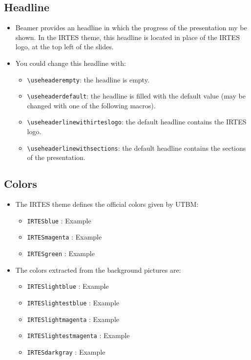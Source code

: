 \documentclass[english,circlenumberstyle]{irtesbeamer}
\begin{document}
\subsection{Headline}
\begin{frame}{\subsecname}
	\begin{footnotesize}
	\begin{itemize}
	\item Beamer provides an headline in which the progress of the presentation my be shown.
	In the IRTES theme, this headline is located in place of the IRTES logo, at the top left of the slides.
	\item You could change this headline with: \begin{itemize}\footnotesize
		\item \texttt{{\textbackslash}useheaderempty}: the headline is empty.
		\item \texttt{{\textbackslash}useheaderdefault}: the headline is filled with the default value (may be changed with one of the following macros).
		\item \texttt{{\textbackslash}useheaderlinewithirteslogo}: the default headline contains the IRTES logo.
		\item \texttt{{\textbackslash}useheaderlinewithsections}: the default headline contains the sections of the presentation.
		\end{itemize}
	\end{itemize}
	\end{footnotesize}
\end{frame}

\subsection{Colors}
\begin{frame}{\subsecname}
	\begin{itemize}
	\item The IRTES theme defines the official colors given by UTBM:
		\begin{itemize}
		\item \texttt{IRTESblue} : \textcolor{IRTESblue}{Example}
		\item \texttt{IRTESmagenta} : \textcolor{IRTESmagenta}{Example}
		\item \texttt{IRTESgreen} : \textcolor{IRTESgreen}{Example}
		\end{itemize}
	\item The colors extracted from the background pictures are:
		\begin{itemize}
		\item \texttt{IRTESlightblue} : \textcolor{IRTESlightblue}{Example}
		\item \texttt{IRTESlightestblue} : \textcolor{IRTESlightestblue}{Example}
		\item \texttt{IRTESlightmagenta} : \textcolor{IRTESlightmagenta}{Example}
		\item \texttt{IRTESlightestmagenta} : \textcolor{IRTESlightestmagenta}{Example}
		\item \texttt{IRTESdarkgray} : \textcolor{IRTESdarkgray}{Example}
		\end{itemize}
	\end{itemize}
\end{frame}
\end{document}
